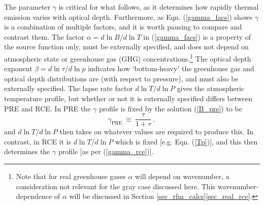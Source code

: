 \documentclass{ametsoc}
\newcommand{\beqn}{\begin{equation}}
\newcommand{\eeqn}{\end{equation}}
\newcommand{\n}{\nonumber}
\newcommand{\eqnref}[1]{(\ref{#1})}
\begin{document}
The parameter $\gamma$ is critical for what follows, as it determines how rapidly thermal emission varies with optical depth. Furthermore, as Eqn. \eqnref{gamma_facs} shows $\gamma$ is a combination of multiple factors, and it is worth pausing to compare and contrast them. The factor $\alpha = d \ln B/ d \ln T$ in \eqnref{gamma_facs}  is a property of the source function only, must be externally specified, and does not depend on atmospheric state or greenhouse gas (GHG) concentrations.\footnote{Note that for real greenhouse gases $\alpha$ will depend on wavenumber, a consideration not relevant for the gray case discussed here. This wavenumber-dependence of $\alpha$ will be discussed in Section \ref{sec_rfm_calcs}\ref{sec_real_rce}.} The optical depth exponent $\beta = d\ln \tau/d \ln p$ indicates how `bottom-heavy' the greenhouse gas and optical depth distributions are (with respect to pressure), and must also be externally specified.  The lapse rate factor $d \ln T/ d\ln P$ gives the atmospheric temperature profile, but whether or not it is externally specified differs between PRE and RCE. In PRE the $\gamma$ profile is fixed by the solution \eqnref{B_pre} to be 
\beqn
	\gamma_{\mathrm{PRE}} \  \equiv \ \frac{\tau}{1+\tau} \ ,
	\n
\eeqn
 and $d \ln T/ d\ln P$ then takes on whatever values are required to produce this. In contrast, in RCE it is $d \ln T/ d\ln P$ which is fixed [e.g. Eqn. \eqnref{Tp}], and this then determines the $\gamma$ profile [as per \eqnref{gamma_rce}].
\end{document}
